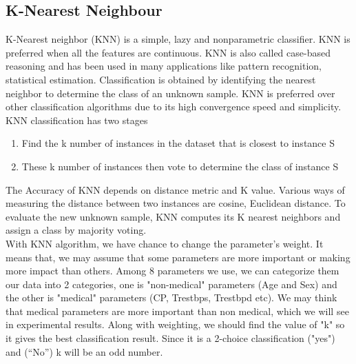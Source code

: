 \documentclass{book}
\begin{document}
    		\subsection{K-Nearest Neighbour}  
    		K-Nearest neighbor (KNN) is a simple, lazy and nonparametric classifier. KNN is preferred when all the features are continuous. KNN is also called case-based reasoning and has been used in many applications like pattern recognition, statistical estimation. Classification is obtained by identifying the nearest neighbor to determine the class of an unknown sample. KNN is preferred over other classification algorithms due to its high convergence speed and simplicity.\\
    		KNN classification has two stages
    		\begin{enumerate}
    			\item Find the k number of instances in the dataset that is closest to instance S
    			\item These k number of instances then vote to determine the class of instance S
    		\end{enumerate}
    		The Accuracy of KNN depends on distance metric and K value. Various ways of measuring the distance between two instances are cosine, Euclidean distance. To evaluate the new unknown sample, KNN computes its K nearest neighbors and assign a class by majority voting.\\    		
    		With KNN algorithm, we have chance to change the parameter's weight. It means that, we may assume that some parameters are more important or making more impact than others. Among 8 parameters we use, we can categorize them our data into 2 categories, one is "non-medical" parameters (Age and Sex) and the other is "medical" parameters (CP, Trestbps, Trestbpd etc). We may think that medical parameters are more important than non medical, which we will see in experimental results. Along with weighting, we should find the value of "k" so it gives the best classification result. Since it is a 2-choice classification ("yes") and (“No”) k will be an odd number.
    		
\end{document}

